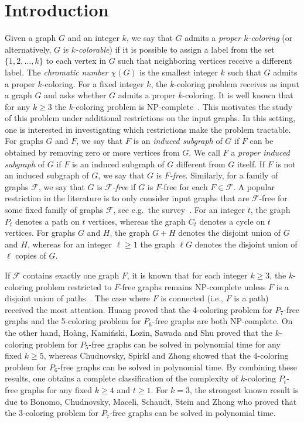 \documentclass[11pt,a4paper]{article}
\theoremstyle{definition}
\begin{document}
\section{Introduction}
Given a graph $G$ and an integer $k$, we say that $G$ admits a \textit{proper $k$-coloring} (or alternatively, $G$ is \textit{$k$-colorable}) if it is possible to assign a label from the set $\{1,2,\ldots,k\}$ to each vertex in $G$ such that neighboring vertices receive a different label. The \textit{chromatic number $\chi(G)$} is the smallest integer $k$ such that $G$ admits a proper $k$-coloring. For a fixed integer $k$, the $k$-coloring problem receives as input a graph $G$ and asks whether $G$ admits a proper $k$-coloring. It is well known that for any $k \geq 3$ the $k$-coloring problem is NP-complete~\cite{K72}. This motivates the study of this problem under additional restrictions on the input graphs. In this setting, one is interested in investigating which restrictions make the problem tractable. For graphs $G$ and $F$, we say that $F$ is an \textit{induced subgraph} of $G$ if $F$ can be obtained by removing zero or more vertices from $G$. We call $F$ a \textit{proper induced subgraph} of $G$ if $F$ is an induced subgraph of $G$ different from $G$ itself. If $F$ is not an induced subgraph of $G$, we say that $G$ is \textit{$F$-free}. Similarly, for a family of graphs $\mathcal{F}$, we say that $G$ is \textit{$\mathcal{F}$-free} if $G$ is $F$-free for each $F \in \mathcal{F}$. A popular restriction in the literature is to only consider input graphs that are $\mathcal{F}$-free for some fixed family of graphs $\mathcal{F}$, see e.g.\ the survey~\cite{GJPS17}. For an integer $t$, the graph $P_t$ denotes a path on $t$ vertices, whereas the graph $C_t$ denotes a cycle on $t$ vertices. For graphs $G$ and $H$, the graph $G+H$ denotes the disjoint union of $G$ and $H$, whereas for an integer $\ell \geq 1$ the graph $\ell G$ denotes the disjoint union of $\ell$ copies of $G$.

If $\mathcal{F}$ contains exactly one graph $F$, it is known that for each integer $k \geq 3$, the $k$-coloring problem restricted to $F$-free graphs remains NP-complete unless $F$ is a disjoint union of paths~\cite{EHK98,HI81,LD83}. The case where $F$ is connected (i.e., $F$ is a path) received the most attention. Huang \cite{HS13} proved that the 4-coloring problem for $P_7$-free graphs and the 5-coloring problem for $P_6$-free graphs are both NP-complete. On the other hand, Ho\`{a}ng, Kami\'{n}ski, Lozin, Sawada and Shu \cite{HKLSS10} proved that the $k$-coloring problem for $P_5$-free graphs can be solved in polynomial time for any fixed $k\geq 5$, whereas Chudnovsky, Spirkl and Zhong \cite{CM24,CM241} showed that the $4$-coloring problem for $P_6$-free graphs can be solved in polynomial time. By combining these results, one obtains a complete classification of the complexity of $k$-coloring $P_t$-free graphs for any fixed $k\geq 4$ and $t \geq 1$. 
For $k=3$, the strongest known result is due to Bonomo, Chudnovsky, Maceli, Schaudt, Stein and Zhong \cite{BCMSSZ18} who proved that the 3-coloring problem for $P_7$-free graphs can be solved in polynomial time.
\end{document}
